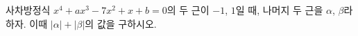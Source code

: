 사차방정식 $x^4+ax^3-7x^2+x+b=0$의 두 근이 $-1$, $1$일 때, 나머지 두 근을 $\alpha$, $\beta$라 하자. 이때 $|\alpha|+|\beta|$의 값을 구하시오. 
